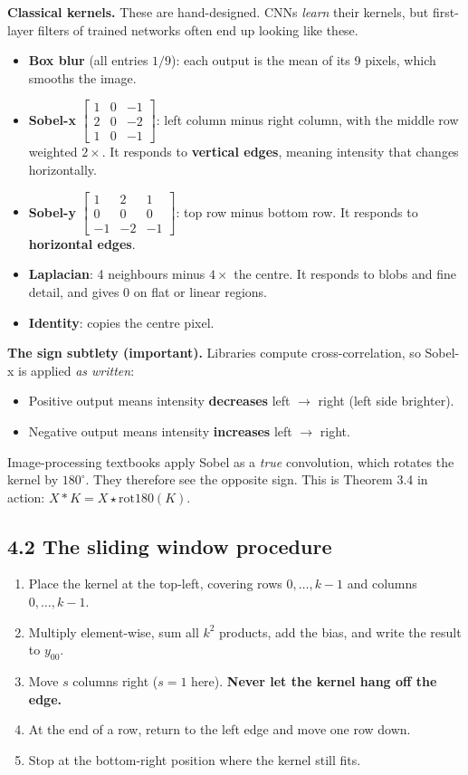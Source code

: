 \textbf{Classical kernels.} These are hand-designed. CNNs \emph{learn} their kernels, but first-layer filters of trained networks often end up looking like these.
\begin{itemize}[nosep]
  \item \textbf{Box blur} (all entries $1/9$): each output is the mean of its 9 pixels, which smooths the image.
  \item \textbf{Sobel-x} $\begin{bmatrix}1&0&-1\\2&0&-2\\1&0&-1\end{bmatrix}$: left column minus right column, with the middle row weighted $2\times$. It responds to \textbf{vertical edges}, meaning intensity that changes horizontally.
  \item \textbf{Sobel-y} $\begin{bmatrix}1&2&1\\0&0&0\\-1&-2&-1\end{bmatrix}$: top row minus bottom row. It responds to \textbf{horizontal edges}.
  \item \textbf{Laplacian}: 4 neighbours minus $4\times$ the centre. It responds to blobs and fine detail, and gives 0 on flat or linear regions.
  \item \textbf{Identity}: copies the centre pixel.
\end{itemize}

\textbf{The sign subtlety (important).} Libraries compute cross-correlation, so Sobel-x is applied \emph{as written}:
\begin{itemize}[nosep]
  \item Positive output means intensity \textbf{decreases} left $\to$ right (left side brighter).
  \item Negative output means intensity \textbf{increases} left $\to$ right.
\end{itemize}
Image-processing textbooks apply Sobel as a \emph{true} convolution, which rotates the kernel by $180^\circ$. They therefore see the opposite sign. This is Theorem 3.4 in action: $X * K = X \star \mathrm{rot180}(K)$.

\subsection*{4.2 The sliding window procedure}

\begin{enumerate}[nosep]
  \item Place the kernel at the top-left, covering rows $0,\dots,k-1$ and columns $0,\dots,k-1$.
  \item Multiply element-wise, sum all $k^2$ products, add the bias, and write the result to $y_{00}$.
  \item Move $s$ columns right ($s=1$ here). \textbf{Never let the kernel hang off the edge.}
  \item At the end of a row, return to the left edge and move one row down.
  \item Stop at the bottom-right position where the kernel still fits.
\end{enumerate}


